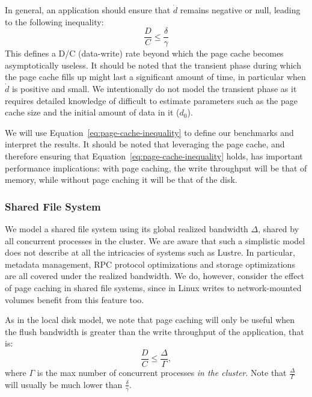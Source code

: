 In general, an application should ensure that $\dot d$ remains negative 
or null, leading to the following inequality:
\begin{equation}
\frac{D}{C} \leq \frac{\delta}{\gamma} \label{eq:page-cache-inequality}
\end{equation}
This defines a D/C (data-write) rate beyond which the page cache becomes 
asymptotically useless. It should be noted that the transient phase 
during which the page cache fills up might last a significant amount of time, 
in particular when $\dot d$ is positive and small. We intentionally do not model the 
transient phase as it requires detailed knowledge of difficult to estimate parameters  
such as the page cache size and the initial amount 
of data in it ($d_0$).

 We will use Equation~\ref{eq:page-cache-inequality} to 
define our benchmarks and interpret the results. It 
should be noted that leveraging the page cache, and therefore ensuring 
that Equation~\ref{eq:page-cache-inequality} holds, has important 
performance implications: with page caching, the write throughput will 
be that of memory, while without page caching it will be that of the 
disk.


\subsubsection{Shared File System}

We model a shared file system using its global realized bandwidth 
$\Delta$, shared by all concurrent processes in the cluster. We are 
aware that such a simplistic model does not describe at all the 
intricacies of systems such as Lustre. In particular, metadata 
management, RPC protocol optimizations and storage optimizations are 
all covered under the realized bandwidth. We do, however, consider the 
effect of page caching in shared file systems, since in Linux 
writes to network-mounted volumes benefit from this feature too.

As in the local disk model, we note that page caching will only be 
useful when the flush bandwidth is greater than the write throughput of 
the application, that is:
\begin{equation}
\frac{D}{C} \leq \frac{\Delta}{\Gamma}, \label{eq:page-cache-sharedfs}
\end{equation}
where $\Gamma$ is the max number of concurrent processes \emph{in the cluster}. 
Note that $\frac{\Delta}{\Gamma}$ will usually be much lower than 
$\frac{\delta}{\gamma}$.     



